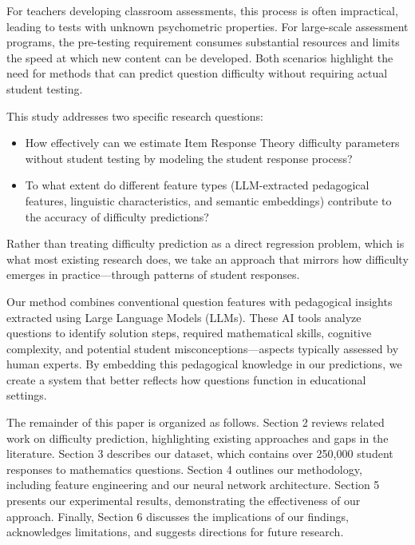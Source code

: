 \documentclass[
    a4paper, %
    10pt, %
    twoside, %
]{LTJournalArticle}
\begin{document}
For teachers developing classroom assessments, this process is often impractical, leading to tests with unknown psychometric properties. For large-scale assessment programs, the pre-testing requirement consumes substantial resources and limits the speed at which new content can be developed. Both scenarios highlight the need for methods that can predict question difficulty without requiring actual student testing.

This study addresses two specific research questions:
\begin{itemize}
    \item How effectively can we estimate Item Response Theory difficulty parameters without student testing by modeling the student response process?
    \item To what extent do different feature types (LLM-extracted pedagogical features, linguistic characteristics, and semantic embeddings) contribute to the accuracy of difficulty predictions?
\end{itemize}

Rather than treating difficulty prediction as a direct regression problem, which is what most existing research does, we take an approach that mirrors how difficulty emerges in practice—through patterns of student responses.

Our method combines conventional question features with pedagogical insights extracted using Large Language Models (LLMs). These AI tools analyze questions to identify solution steps, required mathematical skills, cognitive complexity, and potential student misconceptions—aspects typically assessed by human experts. By embedding this pedagogical knowledge in our predictions, we create a system that better reflects how questions function in educational settings.

The remainder of this paper is organized as follows. Section 2 reviews related work on difficulty prediction, highlighting existing approaches and gaps in the literature. Section 3 describes our dataset, which contains over 250,000 student responses to mathematics questions. Section 4 outlines our methodology, including feature engineering and our neural network architecture. Section 5 presents our experimental results, demonstrating the effectiveness of our approach. Finally, Section 6 discusses the implications of our findings, acknowledges limitations, and suggests directions for future research.

\end{document}
